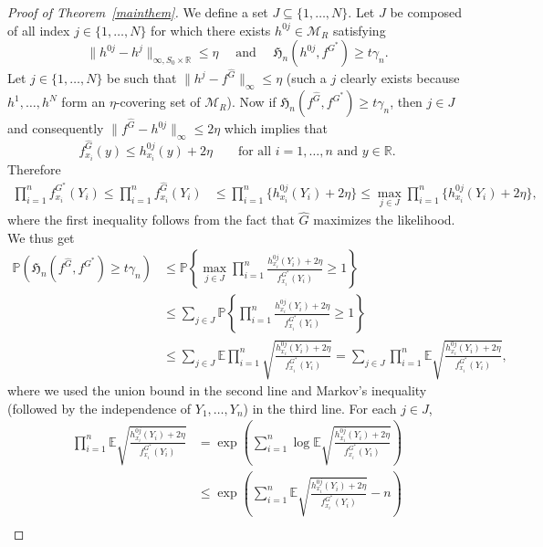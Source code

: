 \documentclass[11pt]{article}
\numberwithin{equation}{section}
\newcommand{\RS}{\mathbb{R}}
\newcommand{\Y}{Y}
\def\qt#1{\qquad\text{#1}}
\newcommand{\E}{\mathbb{E}}
\newcommand{\PP}{\mathbb{P}}
\begin{document}
\begin{appendices}
\begin{proof}[Proof of Theorem~\ref{mainthem}]
We define a set $J\subseteq \{1,\dots,N\}$. Let $J$ be composed of all index $j \in \{ 1,\dots, N\}$ for which there exists $h^{0j}\in \mathcal{M}_R$ satisfying
\begin{equation}
\| h^{0j} - h^j \|_{\infty, S_0\times \RS } \leq \eta \quad \text{ and } \quad \mathfrak{H}_n(h^{0j}, f^{G^*}) \geq t\gamma_n.
\label{eq:J_defn}
\end{equation}
Let $j \in \{1, \dots, N\}$ be such that $\| h^j - {f}^{\hat{G}} \|_{\infty} \leq \eta$ (such a $j$ clearly exists because $h^1, \dots, h^N$ form an $\eta$-covering set of $\mathcal{M}_R$). Now if $\mathfrak{H}_n(f^{\hat{G}}, f^{G^*}) \geq t\gamma_n$, then $j \in J$ and consequently $\| {f}^{\hat{G}} - h^{0j}\|_{\infty} \leq 2\eta$ which implies that 
\[
f^{\hat{G}}_{x_i}(y) \leq h^{0j}_{x_i}(y) + 2\eta \qt{for all $i = 1, \dots, n$ and $y \in \mathbb{R}$}. 
\]
Therefore
\[
\begin{split}
\prod_{i=1}^n f^{{G}^*}_{x_i}(\Y_i) \leq \prod_{i=1}^n f^{\hat{G}}_{x_i}(\Y_i) &\leq \prod_{i = 1}^n\{ h^{0j}_{x_i}(\Y_i) + 2\eta\} \leq \max_{j \in J} \prod_{i = 1}^n\{ h^{0j}_{x_i}(\Y_i) + 2\eta\},
\end{split}
\]
where the first inequality follows from the fact that $\hat{G}$ maximizes the likelihood. We thus get 
\begin{equation*}
\begin{split}
\PP(\mathfrak{H}_n(f^{\hat{G}}, f^{G^*}) \geq t \gamma_n)  
&\leq  \PP\left\{ \max_{j\in J} \prod_{i=1}^n \frac{h^{0j}_{x_i}(\Y_i) + 2 \eta }{f^{G^*}_{x_i}(\Y_i)} \geq 1 \right\} \\
&\leq 
\sum_{j \in J} \PP \left\{\prod_{i=1}^n \frac{h^{0j}_{x_i}(\Y_i) + 2\eta }{f^{G^*}_{x_i}(\Y_i)} \geq 1 \right\} \\
& \leq \sum_{j\in J} \E \prod_{i=1}^n \sqrt{ \frac{h^{0j}_{x_i}(\Y_i) + 2 \eta}{f^{G^*}_{x_i}(\Y_i)}}  = \sum_{j\in J}\prod_{i=1}^n \E \sqrt{ \frac{h^{0j}_{x_i}(\Y_i) + 2 \eta}{f^{G^*}_{x_i}(\Y_i)}},
\end{split}
\end{equation*}
where we used the union bound in the second line and Markov's inequality (followed by the independence of $Y_1, \dots, Y_n$) in the third line. For each $j \in J$, 
\[
\begin{split}
\prod_{i=1}^n  \E \sqrt{ \frac{h^{0j}_{x_i}(\Y_i) + 2 \eta}{f^{G^*}_{x_i}(\Y_i)}} & = \exp\left( \sum_{i=1}^n \log \E \sqrt{ \frac{h^{0j}_{x_i}(\Y_i) + 2 \eta}{f^{G^*}_{x_i}(\Y_i)}} \right)\\
& \leq \exp\left(\sum_{i=1}^n  \E \sqrt{ \frac{h^{0j}_{x_i}(\Y_i) + 2 \eta}{f^{G^*}_{x_i}(\Y_i)}} - n \right) \\

\end{split}\]
\end{proof}
\end{appendices}
\end{document}
